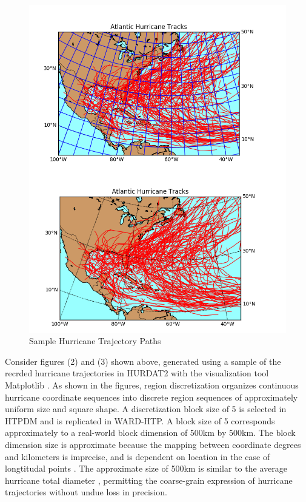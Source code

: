 \documentclass[12pt,conference]{IEEEtran}
\begin{document}
\begin{figure}[htp]
\caption{Sample Hurricane Trajectory Paths}
\centering
\includegraphics[scale=0.55]{Merged-Trajectory-Comparison}
\end{figure}

Consider figures (2) and (3) shown above, generated using a sample of the recrded hurricane trajectories in HURDAT2 with the visualization tool Matplotlib \cite{matplotlib}. As shown in the figures, region discretization organizes continuous hurricane coordinate sequences into discrete region sequences of approximately uniform size and square shape. A discretization block size of 5 is selected in HTPDM and is replicated in WARD-HTP. A block size of 5 corresponds approximately to a real-world block dimension of 500km by 500km. The block dimension size is approximate because the mapping between coordinate degrees and kilometers is imprecise, and is dependent on location in the case of longtitudal points \cite{lat-long-distance}. The approximate size of 500km is similar to the average hurricane total diameter \cite{hurricane-distances}, permitting the coarse-grain expression of hurricane trajectories without undue loss in precision.
\end{document}
